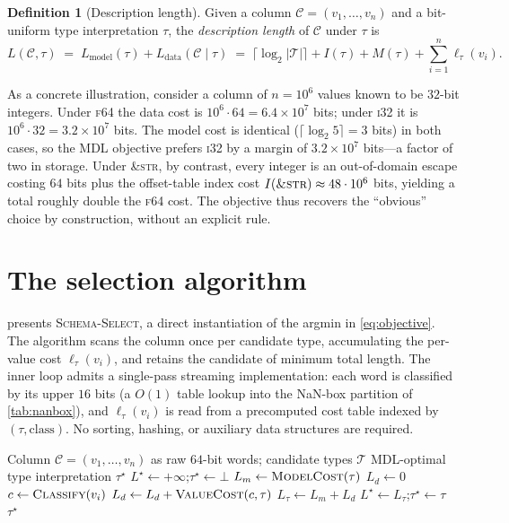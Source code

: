 \documentclass[10pt]{article}
\theoremstyle{definition}
\newtheorem{definition}{Definition}
\theoremstyle{remark}
\newcommand{\Ccal}{\mathcal{C}}
\newcommand{\Tcal}{\mathcal{T}}
\newcommand{\Lmodel}{L_{\mathrm{model}}}
\newcommand{\Ldata}{L_{\mathrm{data}}}
\begin{document}
\begin{definition}[Description length]\label{def:dl}
Given a column $\Ccal = (v_1, \ldots, v_n)$ and a bit-uniform type
interpretation $\tau$, the \emph{description length} of $\Ccal$ under
$\tau$ is
\[
L(\Ccal, \tau) \;=\; \Lmodel(\tau) + \Ldata(\Ccal \mid \tau)
\;=\; \lceil \log_2 |\Tcal| \rceil + I(\tau) + M(\tau) + \sum_{i=1}^{n} \ell_\tau(v_i).
\]
\end{definition}

As a concrete illustration, consider a column of $n = 10^6$ values known
to be $32$-bit integers. Under \textsc{f64} the data cost is
$10^6 \cdot 64 = 6.4 \times 10^7$ bits; under \textsc{i32} it is
$10^6 \cdot 32 = 3.2 \times 10^7$ bits. The model cost is identical
($\lceil \log_2 5 \rceil = 3$ bits) in both cases, so the MDL objective
prefers \textsc{i32} by a margin of $3.2 \times 10^7$ bits---a factor of
two in storage. Under \textsc{\&str}, by contrast, every integer is an
out-of-domain escape costing $64$ bits plus the offset-table index cost
$I(\textsc{\&str}) \approx 48 \cdot 10^6$ bits, yielding a total roughly
double the \textsc{f64} cost. The objective thus recovers the
``obvious'' choice by construction, without an explicit rule.

\section{The selection algorithm}\label{sec:algorithm}

 presents \textsc{Schema-Select}, a direct
instantiation of the argmin in \cref{eq:objective}. The algorithm scans
the column once per candidate type, accumulating the per-value cost
$\ell_\tau(v_i)$, and retains the candidate of minimum total length. The
inner loop admits a single-pass streaming implementation: each word is
classified by its upper $16$ bits (a $O(1)$ table lookup into the NaN-box
partition of \cref{tab:nanbox}), and $\ell_\tau(v_i)$ is read from a
precomputed cost table indexed by $(\tau, \text{class})$. No sorting,
hashing, or auxiliary data structures are required.

\begin{algorithm}[h]
\caption{\textsc{Schema-Select}}\label{alg:schema-select}
\begin{algorithmic}[1]
\Require Column $\Ccal = (v_1, \ldots, v_n)$ as raw $64$-bit words; candidate types $\Tcal$
\Ensure MDL-optimal type interpretation $\tau^\star$
\State $L^\star \gets +\infty$;\quad $\tau^\star \gets \bot$
\For{$\tau \in \Tcal$}
    \State $L_m \gets \textsc{ModelCost}(\tau)$ \Comment{$\lceil \log_2 |\Tcal| \rceil + I(\tau) + M(\tau)$}
    \State $L_d \gets 0$
        \State $c \gets \textsc{Classify}(v_i)$ 
        \State $L_d \gets L_d + \textsc{ValueCost}(c, \tau)$
    \EndFor
    \State $L_\tau \gets L_m + L_d$
        \State $L^\star \gets L_\tau$;\quad $\tau^\star \gets \tau$
    \EndIf
\EndFor
\State \Return $\tau^\star$
\end{algorithmic}
\end{algorithm}
\end{document}
